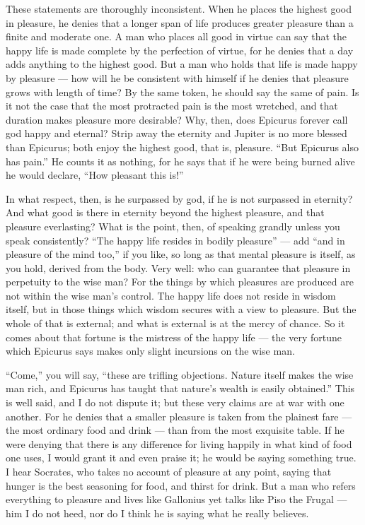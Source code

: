  These statements are thoroughly inconsistent. When he places the highest good in pleasure, he denies that a longer span of life produces greater pleasure than a finite and moderate one. A man who places all good in virtue can say that the happy life is made complete by the perfection of virtue, for he denies that a day adds anything to the highest good. But a man who holds that life is made happy by pleasure — how will he be consistent with himself if he denies that pleasure grows with length of time? By the same token, he should say the same of pain. Is it not the case that the most protracted pain is the most wretched, and that duration makes pleasure more desirable? Why, then, does Epicurus forever call god happy and eternal? Strip away the eternity and Jupiter is no more blessed than Epicurus; both enjoy the highest good, that is, pleasure. ``But Epicurus also has pain.'' He counts it as nothing, for he says that if he were being burned alive he would declare, ``How pleasant this is!''

 In what respect, then, is he surpassed by god, if he is not surpassed in eternity? And what good is there in eternity beyond the highest pleasure, and that pleasure everlasting? What is the point, then, of speaking grandly unless you speak consistently? ``The happy life resides in bodily pleasure'' — add ``and in pleasure of the mind too,'' if you like, so long as that mental pleasure is itself, as you hold, derived from the body. Very well: who can guarantee that pleasure in perpetuity to the wise man? For the things by which pleasures are produced are not within the wise man's control. The happy life does not reside in wisdom itself, but in those things which wisdom secures with a view to pleasure. But the whole of that is external; and what is external is at the mercy of chance. So it comes about that fortune is the mistress of the happy life — the very fortune which Epicurus says makes only slight incursions on the wise man.

 ``Come,'' you will say, ``these are trifling objections. Nature itself makes the wise man rich, and Epicurus has taught that nature's wealth is easily obtained.'' This is well said, and I do not dispute it; but these very claims are at war with one another. For he denies that a smaller pleasure is taken from the plainest fare — the most ordinary food and drink — than from the most exquisite table. If he were denying that there is any difference for living happily in what kind of food one uses, I would grant it and even praise it; he would be saying something true. I hear Socrates, who takes no account of pleasure at any point, saying that hunger is the best seasoning for food, and thirst for drink. But a man who refers everything to pleasure and lives like Gallonius yet talks like Piso the Frugal — him I do not heed, nor do I think he is saying what he really believes.

